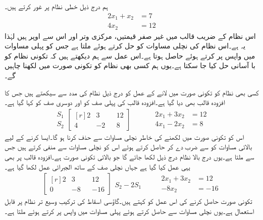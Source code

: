 ہم درج ذیل خطی نظام پر غور کرتے ہیں۔
\begin{align*}
2x_1+x_2&=7\\
4x_2&=12
\end{align*}
اس نظام کے  ضریب  قالب میں غیر صفر قیمتیں، مرکزی وتر اور اس سے اوپر ہیں لہٰذا یہ  ہے۔اس نظام کی نچلی مساوات کو حل کرتے ہوئے  ملتا ہے جس کو پہلی مساوات میں واپس پر کرتے ہوئے  حاصل ہوتا ہے۔اس عمل سے ہم دیکھتے ہیں کہ تکونی نظام کو با آسانی حل کیا جا سکتا ہے۔یوں ہم  کسی بھی نظام کو تکونی صورت میں لکھنا چاہیں گے۔

کسی بھی نظام کو تکونی صورت میں لانے کے عمل کو درج ذیل نظام کی مدد سے سیکھتے ہیں جس کا افزودہ قالب بھی دیا گیا ہے۔افزودہ قالب کی پہلی صف کو  اور دوسری صف کو  کہا گیا ہے۔
\begin{gather*}
\begin{matrix} S_1\\S_2 \end{matrix}\begin{bmatrix*}[r]2&3&&12\\ 4&-2&&8  \end{bmatrix*}\quad \quad\quad 
\begin{aligned}
2x_1+3x_2&=12\\
4x_1-2x_2&=8
\end{aligned}
\end{gather*} 
اس کو تکونی صورت میں لکھنے کی خاطر نچلی مساوات سے  حذف کرنا ہو گا۔ایسا کرنے کے لیے بالائی مساوات کو  سے ضرب دے کر 
 حاصل کرتے ہوئے اس کو  نچلی مساوات سے منفی کرتے ہیں جس سے  ملتا ہے۔یوں درج بالا نظام درج ذیل لکھا جائے گا جو بالائی تکونی صورت ہے۔افزودہ قالب پر بھی یہی عمل کیا گیا ہے جہاں نچلی صف کے  ساتھ الجبرائی عمل  لکھا گیا ہے۔
\begin{gather*}
\begin{bmatrix*}[r] 2&3&&12\\0 &-8&&-16 \end{bmatrix*}\begin{matrix} \\ S_2-2S_1 \end{matrix}\quad \quad
 \begin{aligned}
2x_1+3x_2&=12\\
-8x_2&=-16
\end{aligned} 
\end{gather*} 
تکونی صورت حاصل کرنے کی اس عمل کو  کہتے ہیں۔گاؤسی اسقاط کی ترکیب وسیع تر نظام پر قابل استعمال ہے۔یوں نچلی مساوات سے  حاصل کرتے ہوئے پہلی مساوات میں واپس پر کرتے ہوئے  ملتا ہے۔
